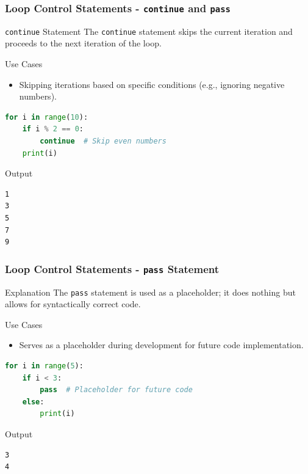 \documentclass{beamer}
\begin{document}
\begin{frame}[fragile]
    \frametitle{Loop Control Statements - \texttt{continue} and \texttt{pass}}
    \begin{block}{\texttt{continue} Statement}
        The \texttt{continue} statement skips the current iteration and proceeds to the next iteration of the loop.
    \end{block}
    
    \begin{block}{Use Cases}
        \begin{itemize}
            \item Skipping iterations based on specific conditions (e.g., ignoring negative numbers).
        \end{itemize}
    \end{block}
    
    \begin{lstlisting}[language=Python]
for i in range(10):
    if i % 2 == 0:
        continue  # Skip even numbers
    print(i)
    \end{lstlisting}
    
    \begin{block}{Output}
        \begin{verbatim}
1
3
5
7
9
        \end{verbatim}
    \end{block}
\end{frame}

\begin{frame}[fragile]
    \frametitle{Loop Control Statements - \texttt{pass} Statement}
    \begin{block}{Explanation}
        The \texttt{pass} statement is used as a placeholder; it does nothing but allows for syntactically correct code.
    \end{block}
    
    \begin{block}{Use Cases}
        \begin{itemize}
            \item Serves as a placeholder during development for future code implementation.
        \end{itemize}
    \end{block}
    
    \begin{lstlisting}[language=Python]
for i in range(5):
    if i < 3:
        pass  # Placeholder for future code
    else:
        print(i)
    \end{lstlisting}
    
    \begin{block}{Output}
        \begin{verbatim}
3
4
        \end{verbatim}
    \end{block}
\end{frame}
\end{document}
